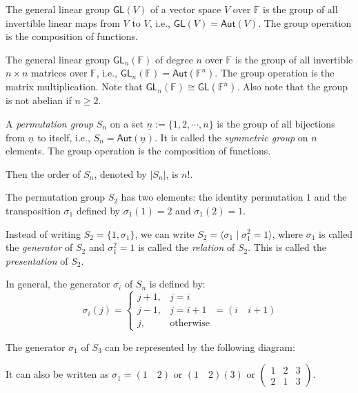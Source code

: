 \documentclass[
	11pt, %
	fleqn, %
	a4paper, %
]{LegrandOrangeBook}
\newcommand{\F}{\mathbb{F}} %
\newcommand{\GL}{\mathsf{GL}} %
\newcommand{\Aut}{\mathsf{Aut}} %
\begin{document}
\begin{example}
    The general linear group $\GL(V)$ of a vector space $V$ over $\F$ is the group of all invertible linear maps from $V$ to $V$, i.e., $\GL(V) = \Aut(V)$. The group operation is the composition of functions.
\end{example}

\begin{example}
    The general linear group $\GL_n(\F)$ of degree $n$ over $\F$ is the group of all invertible $n \times n$ matrices over $\F$, i.e., $\GL_n(\F) = \Aut(\F^n)$. The group operation is the matrix multiplication. Note that $\GL_n(\F) \cong \GL(\F^n)$. Also note that the group is not abelian if $n \geq 2$.
\end{example}

\begin{definition}
    A \emph{permutation group} $S_n$ on a set $\underline{n} := \{ 1, 2, \cdots, n \}$ is the group of all bijections from $\underline{n}$ to itself, i.e., $S_n = \Aut(\underline{n})$. It is called the \emph{symmetric group} on $n$ elements. The group operation is the composition of functions.
\end{definition}

Then the order of $S_n$, denoted by $|S_n|$, is $n!$.

\begin{example}
    The permutation group $S_2$ has two elements: the identity permutation $1$ and the transposition $\sigma_1$ defined by $\sigma_1(1) = 2$ and $\sigma_1(2) = 1$. 
\end{example}

Instead of writing $S_2 = \{ 1, \sigma_1 \}$, we can write $S_2 = \langle \sigma_1 \mid \sigma_1^2 = 1 \rangle$, where $\sigma_1$ is called the \emph{generator} of $S_2$ and $\sigma_1^2 = 1$ is called the \emph{relation} of $S_2$. This is called the \emph{presentation} of $S_2$.

In general, the generator $\sigma_i$ of $S_n$ is defined by:
\[
    \sigma_i(j) = \begin{cases}
        j + 1, & j = i \\
        j - 1, & j = i + 1 \\
        j, & \text{otherwise}
    \end{cases} = (i \quad i + 1)
\]

\begin{example}
    The generator $\sigma_1$ of $S_3$ can be represented by the following diagram:
    \begin{center}
    \end{center}
    It can also be written as $\sigma_1 = (1 \quad 2)$ or $(1 \quad 2)(3)$ or $\begin{pmatrix}
        1 & 2 & 3 \\
        2 & 1 & 3
    \end{pmatrix}$.
\end{example}
\end{document}
